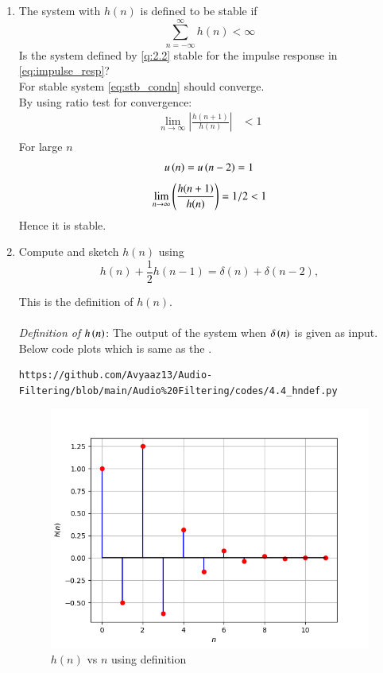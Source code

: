 \documentclass[journal,12pt,twocolumn]{IEEEtran}
\theoremstyle{remark}
\renewcommand\thesection{\arabic{section}}
\numberwithin{equation}{subsection}
\begin{document}
\begin{enumerate}[label=\thesection.\arabic*]
\item The system with $h(n)$ is defined to be stable if
\begin{equation}
\sum_{n=-\infty}^{\infty}h(n) < \infty \label{eq:stb_condn}
\end{equation}
Is the system defined by \eqref{q:2.2} stable for the impulse response in \eqref{eq:impulse_resp}?\\
\solution For stable system \eqref{eq:stb_condn} should converge.\\
By using ratio test for convergence:
\begin{align}
    \lim_{n \to \infty}\left|\frac{h(n + 1)}{h(n)}\right|&<1 \\
\end{align}
For large $n$ 
\begin{align}
    u\left(n\right)=u\left(n-2\right)=1
\end{align}
\begin{align}
  \lim_{n \to \infty}  \left(\frac{h(n + 1)}{h(n)}\right) = 1/2 <1
\end{align}
Hence it is stable.
\item 
Compute and sketch $h(n)$ using 
\begin{equation}
\label{eq:iir_filter_h}
h(n) + \frac{1}{2}h(n-1) = \delta(n) + \delta(n-2), 
\end{equation}

This is the definition of $h(n)$.
\\
\solution\\
{\em Definition of $h\left(n\right)$}: The output of the system when $\delta\left(n\right)$ is given as input.\\

Below code plots  which is same as the . 

\begin{lstlisting}
https://github.com/Avyaaz13/Audio-Filtering/blob/main/Audio%20Filtering/codes/4.4_hndef.py
\end{lstlisting}

\begin{figure}[!ht]
\centering
\includegraphics[width=\columnwidth]{figs/hndef}
\caption{$h(n)$ vs $n$ using definition}
\label{fig:hndef}
\end{figure}


\end{enumerate}
\end{document}
